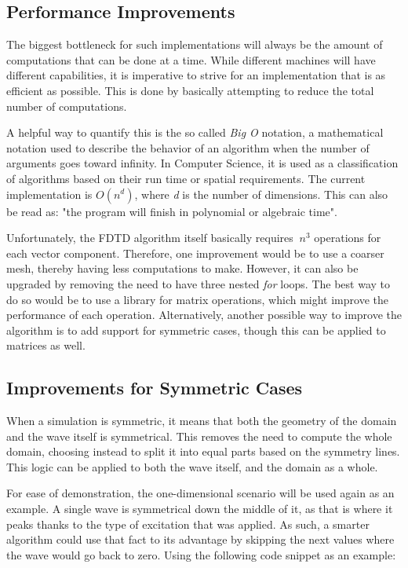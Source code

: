 \subsection{Performance Improvements}

The biggest bottleneck for such implementations will always be the amount of computations that can be done at a time. While different machines will have different capabilities, it is imperative to strive for an implementation that is as efficient as possible. This is done by basically attempting to reduce the total number of computations.

A helpful way to quantify this is the so called \textit{Big O} notation, a mathematical notation used to describe the behavior of an algorithm when the number of arguments goes toward infinity. In Computer Science, it is used as a classification of algorithms based on their run time or spatial requirements\textsuperscript{\cite{mohr2014quantum}}. The current implementation is $O(n^d)$, where \textit{d} is the number of dimensions. This can also be read as: "the program will finish in polynomial or algebraic time".

Unfortunately, the FDTD algorithm itself basically requires $~n^3$ operations for each vector component. Therefore, one improvement would be to use a coarser mesh, thereby having less computations to make. However, it can also be upgraded by removing the need to have three nested \textit{for} loops. The best way to do so would be to use a library for matrix operations, which might improve the performance of each operation. Alternatively, another possible way to improve the algorithm is to add support for symmetric cases, though this can be applied to matrices as well.

\subsection{Improvements for Symmetric Cases}

When a simulation is symmetric, it means that both the geometry of the domain and the wave itself is symmetrical. This removes the need to compute the whole domain, choosing instead to split it into equal parts based on the symmetry lines. This logic can be applied to both the wave itself, and the domain as a whole.

For ease of demonstration, the one-dimensional scenario will be used again as an example. A single wave is symmetrical down the middle of it, as that is where it peaks thanks to the type of excitation that was applied. As such, a smarter algorithm could use that fact to its advantage by skipping the next values where the wave would go back to zero. Using the following code snippet as an example:

